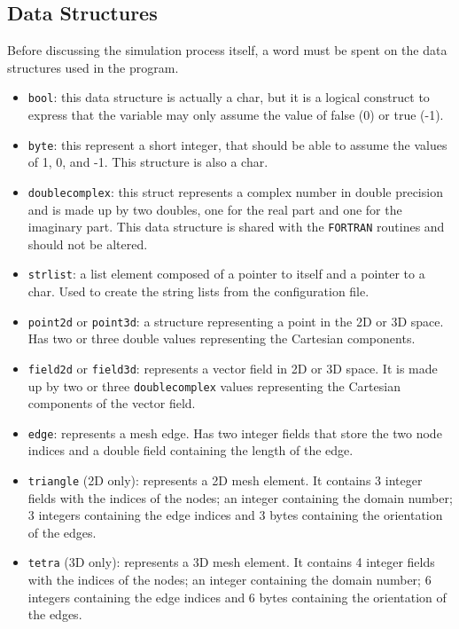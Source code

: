 \documentclass[11pt,a4paper,oneside]{article}
\begin{document}
\subsection{Data Structures}
Before discussing the simulation process itself, a word must be spent on the data structures used in the program.
\begin{itemize}
\item  {\tt bool}: this data structure is actually a char, but it is a logical construct to express that the variable may only assume the value of false (0) or true (-1).
\item {\tt byte}: this represent a short integer, that should be able to assume the values of 1, 0, and -1. This structure is also a char.
\item {\tt doublecomplex}: this struct represents a complex number in double precision and is made up by two doubles, one for the real part and one for the imaginary part. This data structure is shared with the {\tt FORTRAN} routines and should not be altered.
\item {\tt strlist}: a list element composed of a pointer to itself and a pointer to a char. Used to create the string lists from the configuration file.
\item {\tt point2d} or {\tt point3d}: a structure representing a point in the 2D or 3D space. Has two or three double values representing the Cartesian components.
\item {\tt field2d} or {\tt field3d}: represents a vector field in 2D or 3D space. It is made up by two or three {\tt doublecomplex} values representing the Cartesian components of the vector field.
\item {\tt edge}: represents a mesh edge. Has two integer fields that store the two node indices and a double field containing the length of the edge.
\item {\tt triangle} (2D only): represents a 2D mesh element. It contains 3 integer fields with the indices of the nodes; an integer containing the domain number; 3 integers containing the edge indices and 3 bytes containing the orientation of the edges.
\item {\tt tetra} (3D only): represents a 3D mesh element. It contains 4 integer fields with the indices of the nodes; an integer containing the domain number; 6 integers containing the edge indices and 6 bytes containing the orientation of the edges.

\end{itemize}
\end{document}
